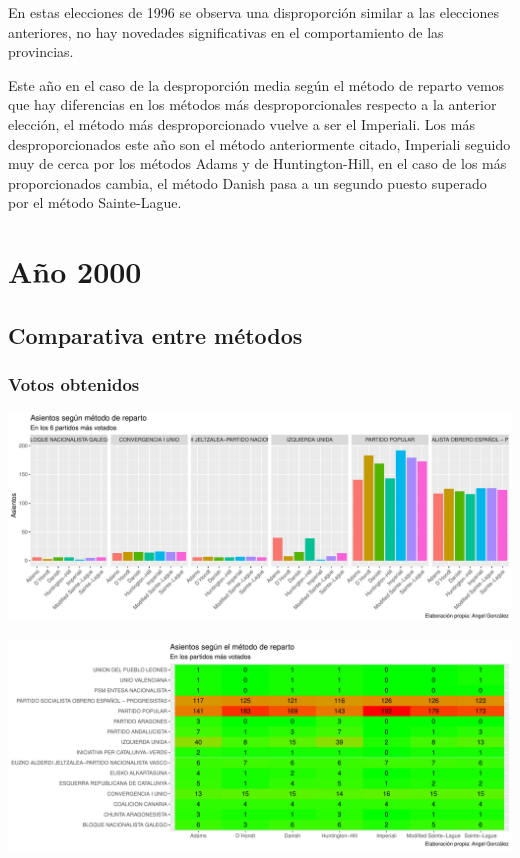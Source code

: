 \documentclass[12pt,a4paper,]{book}
\numberwithin{dummy}{section}
\theoremstyle{ocrenumbox}
\theoremstyle{blacknumex}
\theoremstyle{blacknumbox}
\theoremstyle{ocrenum}
\theoremstyle{ocrenum}
\begin{document}
En estas elecciones de 1996 se observa una disproporción similar a las
elecciones anteriores, no hay novedades significativas en el
comportamiento de las provincias.

Este año en el caso de la desproporción media según el método de reparto
vemos que hay diferencias en los métodos más desproporcionales respecto
a la anterior elección, el método más desproporcionado vuelve a ser el
Imperiali. Los más desproporcionados este año son el método
anteriormente citado, Imperiali seguido muy de cerca por los métodos
Adams y de Huntington-Hill, en el caso de los más proporcionados cambia,
el método Danish pasa a un segundo puesto superado por el método
Sainte-Lague.

\hypertarget{auxf1o-2000}{%
\section{Año 2000}\label{auxf1o-2000}}

\hypertarget{comparativa-entre-muxe9todos-7}{%
\subsection{Comparativa entre
métodos}\label{comparativa-entre-muxe9todos-7}}

\hypertarget{votos-obtenidos-7}{%
\subsubsection{Votos obtenidos}\label{votos-obtenidos-7}}

\begin{center}\includegraphics[width=0.95\linewidth]{figurasR/unnamed-chunk-122-1} \end{center}

\begin{center}\includegraphics[width=0.95\linewidth]{figurasR/unnamed-chunk-122-2} \end{center}
\end{document}

